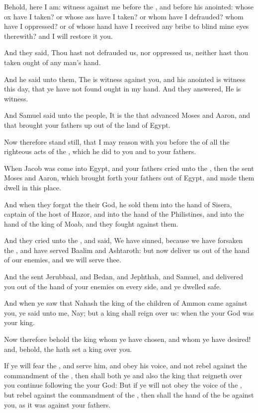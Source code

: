 \verse Behold, here I am: witness against me before the \LORD, and before his anointed: whose ox have I taken? or whose ass have I taken? or whom have I defrauded? whom have I oppressed? or of whose hand have I received any bribe to blind mine eyes therewith? and I will restore it you.

\verse And they said, Thou hast not defrauded us, nor oppressed us, neither hast thou taken ought of any man's hand.

\verse And he said unto them, The \LORD is witness against you, and his anointed is witness this day, that ye have not found ought in my hand.  And they answered, He is witness.

\verse And Samuel said unto the people, It is the \LORD that advanced Moses and Aaron, and that brought your fathers up out of the land of Egypt.

\verse Now therefore stand still, that I may reason with you before the \LORD of all the righteous acts of the \LORD, which he did to you and to your fathers.

\verse When Jacob was come into Egypt, and your fathers cried unto the \LORD, then the \LORD sent Moses and Aaron, which brought forth your fathers out of Egypt, and made them dwell in this place.

\verse And when they forgat the \LORD their God, he sold them into the hand of Sisera, captain of the host of Hazor, and into the hand of the Philistines, and into the hand of the king of Moab, and they fought against them.

\verse And they cried unto the \LORD, and said, We have sinned, because we have forsaken the \LORD, and have served Baalim and Ashtaroth: but now deliver us out of the hand of our enemies, and we will serve thee.

\verse And the \LORD sent Jerubbaal, and Bedan, and Jephthah, and Samuel, and delivered you out of the hand of your enemies on every side, and ye dwelled safe.

\verse And when ye saw that Nahash the king of the children of Ammon came against you, ye said unto me, Nay; but a king shall reign over us: when the \LORD your God was your king.

\verse Now therefore behold the king whom ye have chosen, and whom ye have desired! and, behold, the \LORD hath set a king over you.

\verse If ye will fear the \LORD, and serve him, and obey his voice, and not rebel against the commandment of the \LORD, then shall both ye and also the king that reigneth over you continue following the \LORD your God: \verse But if ye will not obey the voice of the \LORD, but rebel against the commandment of the \LORD, then shall the hand of the \LORD be against you, as it was against your fathers.

